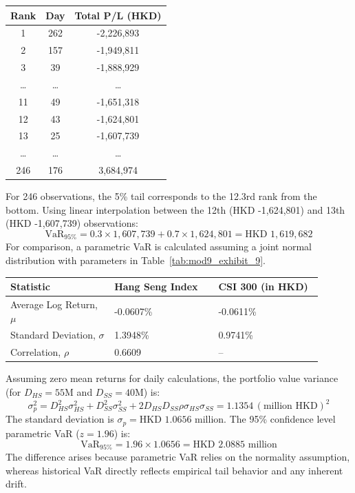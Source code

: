 \begin{tcolorbox}
\begin{center}
\centering
{}
\label{tab:mod9_exhibit_8}
\begin{tabular}{c c c}
	\toprule
	\textbf{Rank} & \textbf{Day} & \textbf{Total P/L (HKD)} \\
	\midrule
	1 & 262 & -2,226,893 \\
	2 & 157 & -1,949,811 \\
	3 & 39 & -1,888,929 \\
	\dots & \dots & \dots \\
	11 & 49 & -1,651,318 \\
	12 & 43 & -1,624,801 \\
	13 & 25 & -1,607,739 \\
	\dots & \dots & \dots \\
	246 & 176 & 3,684,974 \\
	\bottomrule
\end{tabular}
\end{center}

For 246 observations, the 5\% tail corresponds to the 12.3rd rank from the bottom. Using linear interpolation between the 12th (HKD -1,624,801) and 13th (HKD -1,607,739) observations:
\[
\text{VaR}_{95\%} = 0.3 \times 1,607,739 + 0.7 \times 1,624,801 = \text{HKD } 1,619,682
\]
For comparison, a parametric VaR is calculated assuming a joint normal distribution with parameters in Table~\ref{tab:mod9_exhibit_9}.

\begin{center}
\centering
{}
\label{tab:mod9_exhibit_9}
\begin{tabular}{p{0.3\linewidth} p{0.3\linewidth} p{0.3\linewidth}}
	\toprule
	\textbf{Statistic} & \textbf{Hang Seng Index} & \textbf{CSI 300 (in HKD)} \\
	\midrule
	Average Log Return, $\mu$ & -0.0607\% & -0.0611\% \\
	Standard Deviation, $\sigma$ & 1.3948\% & 0.9741\% \\
	Correlation, $\rho$ & 0.6609 & -- \\
	\bottomrule
\end{tabular}
\end{center}

Assuming zero mean returns for daily calculations, the portfolio value variance (for $D_{HS} = 55\text{M}$ and $D_{SS} = 40\text{M}$) is:
\[
	\sigma_p^2 = D_{HS}^2 \sigma_{HS}^2 + D_{SS}^2 \sigma_{SS}^2 + 2 D_{HS} D_{SS} \rho \sigma_{HS} \sigma_{SS} = 1.1354 \, (\text{million HKD})^2
\]
The standard deviation is $\sigma_p = \text{HKD } 1.0656\text{ million}$. The 95\% confidence level parametric VaR ($z = 1.96$) is:
\[
\text{VaR}_{95\%} = 1.96 \times 1.0656 = \text{HKD } 2.0885 \text{ million}
\]
The difference arises because parametric VaR relies on the normality assumption, whereas historical VaR directly reflects empirical tail behavior and any inherent drift.
\end{tcolorbox}

